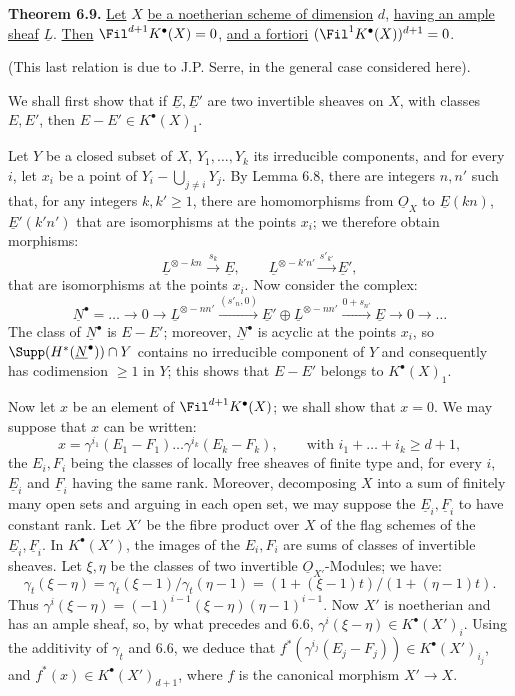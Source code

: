 \textbf{Theorem 6.9.} \uline{Let} $X$ \uline{be a noetherian scheme of dimension} $d$, \uline{having an ample sheaf} $\underline{L}$. \uline{Then} $\Fil^{d+1}K^{\bullet}(X)=0$, \uline{and a fortiori} $(\Fil^1K^{\bullet}(X))^{d+1}=0$.

(This last relation is due to J.P. Serre, in the general case considered here).

We shall first show that if $\underline{E},\underline{E}'$ are two invertible sheaves on $X$, with classes $E,E'$, then $E-E'\in K^{\bullet}(X)_1$.

Let $Y$ be a closed subset of $X$, $Y_1,\ldots,Y_k$ its irreducible components, and for every $i$, let $x_i$ be a point of $Y_i-\bigcup_{j\ne i}Y_j$. By Lemma 6.8, there are integers $n,n'$ such that, for any integers $k,k'\ge1$, there are homomorphisms from $\underline{O}_X$ to $\underline{E}(kn)$, $\underline{E}'(k'n')$ that are isomorphisms at the points $x_i$; we therefore obtain morphisms:
\[
  \underline{L}^{\otimes -kn}\xrightarrow{s_k} \underline{E},
  \qquad
  \underline{L}^{\otimes -k'n'}\xrightarrow{s'_{k'}} \underline{E}',
\]
%
that are isomorphisms at the points $x_i$. Now consider the complex:
\[
  \underline{N}^\bullet=\ldots\to0\to \underline{L}^{\otimes -nn'}
    \xrightarrow{(s'_n,0)} \underline{E}'\oplus \underline{L}^{\otimes -nn'}
    \xrightarrow{0+s_{n'}} \underline{E}\to0\to\ldots
\]
The class of $\underline{N}^\bullet$ is $E-E'$; moreover, $\underline{N}^\bullet$ is acyclic at the points $x_i$, so $\Supp(H^*(\underline{N}^\bullet))\cap Y$ contains no irreducible component of $Y$ and consequently has codimension $\ge1$ in $Y$; this shows that $E-E'$ belongs to $K^{\bullet}(X)_1$.

Now let $x$ be an element of $\Fil^{d+1}K^{\bullet}(X)$; we shall show that $x=0$. We may suppose that $x$ can be written:
\[
  x=\gamma^{i_1}(E_1-F_1)\ldots\gamma^{i_k}(E_k-F_k),
  \qquad\text{with } i_1+\ldots+i_k\ge d+1,
\]
the $E_i,F_i$ being the classes of locally free sheaves of finite type and, for every $i$, $\underline{E}_i$ and $\underline{F}_i$ having the same rank. Moreover, decomposing $X$ into a sum of finitely many open sets and arguing in each open set, we may suppose the $\underline{E}_i,\underline{F}_i$ to have constant rank. Let $X'$ be the fibre product over $X$ of the flag schemes of the $\underline{E}_i,\underline{F}_i$. In $K^{\bullet}(X')$, the images of the $E_i,F_i$ are sums of classes of invertible sheaves. Let $\xi,\eta$ be the classes of two invertible $\underline{O}_{X'}$-Modules; we have:
\[
  \gamma_t(\xi-\eta)=\gamma_t(\xi-1)/\gamma_t(\eta-1)
  =(1+(\xi-1)t)/(1+(\eta-1)t).
\]
Thus $\gamma^i(\xi-\eta)=(-1)^{i-1}(\xi-\eta)(\eta-1)^{i-1}$. Now $X'$ is noetherian and has an ample sheaf, so, by what precedes and 6.6, $\gamma^i(\xi-\eta)\in K^{\bullet}(X')_i$. Using the additivity of $\gamma_t$ and 6.6, we deduce that $f^*(\gamma^{i_j}(E_j-F_j))\in K^{\bullet}(X')_{i_j}$, and $f^*(x)\in K^{\bullet}(X')_{d+1}$, where $f$ is the canonical morphism $X'\to X$.

